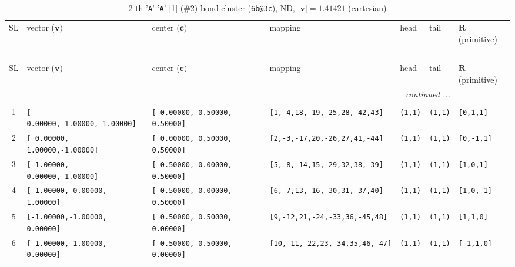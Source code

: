 \documentclass[fleqn,10pt,landscape]{jsarticle}
\begin{document}
\begin{longtable}[l]{cllllll}
\captionsetup{justification=raggedright, singlelinecheck=off}
\caption{2-th '\texttt{A}'-'\texttt{A}' [1] (\#2) bond cluster (\texttt{6b@3c}), ND, $|\bm{v}|=1.41421$ (cartesian)}
 \\
 \hline \hline
SL & vector ($\bm{v})$ & center ($\bm{c})$ & mapping & head & tail & $\bm{R}$ (primitive) \\ \hline \endfirsthead

\multicolumn{6}{l}{\tablename\ \thetable{}} \\
 \hline \hline
SL & vector ($\bm{v})$ & center ($\bm{c})$ & mapping & head & tail & $\bm{R}$ (primitive) \\ \hline \endhead

 \hline \hline
\multicolumn{6}{r}{\footnotesize\it continued ...} \\ \endfoot

 \hline \hline
\multicolumn{6}{r}{} \\ \endlastfoot

1 & \texttt{[ 0.00000,-1.00000,-1.00000]} & \texttt{[ 0.00000, 0.50000, 0.50000]} & \texttt{[1,-4,18,-19,-25,28,-42,43]} & \texttt{(1,1)} & \texttt{(1,1)} & \texttt{[0,1,1]} \\ \hline
2 & \texttt{[ 0.00000, 1.00000,-1.00000]} & \texttt{[ 0.00000, 0.50000, 0.50000]} & \texttt{[2,-3,-17,20,-26,27,41,-44]} & \texttt{(1,1)} & \texttt{(1,1)} & \texttt{[0,-1,1]} \\ \hline
3 & \texttt{[-1.00000, 0.00000,-1.00000]} & \texttt{[ 0.50000, 0.00000, 0.50000]} & \texttt{[5,-8,-14,15,-29,32,38,-39]} & \texttt{(1,1)} & \texttt{(1,1)} & \texttt{[1,0,1]} \\ \hline
4 & \texttt{[-1.00000, 0.00000, 1.00000]} & \texttt{[ 0.50000, 0.00000, 0.50000]} & \texttt{[6,-7,13,-16,-30,31,-37,40]} & \texttt{(1,1)} & \texttt{(1,1)} & \texttt{[1,0,-1]} \\ \hline
5 & \texttt{[-1.00000,-1.00000, 0.00000]} & \texttt{[ 0.50000, 0.50000, 0.00000]} & \texttt{[9,-12,21,-24,-33,36,-45,48]} & \texttt{(1,1)} & \texttt{(1,1)} & \texttt{[1,1,0]} \\ \hline
6 & \texttt{[ 1.00000,-1.00000, 0.00000]} & \texttt{[ 0.50000, 0.50000, 0.00000]} & \texttt{[10,-11,-22,23,-34,35,46,-47]} & \texttt{(1,1)} & \texttt{(1,1)} & \texttt{[-1,1,0]} \\
\end{longtable}
\end{document}
